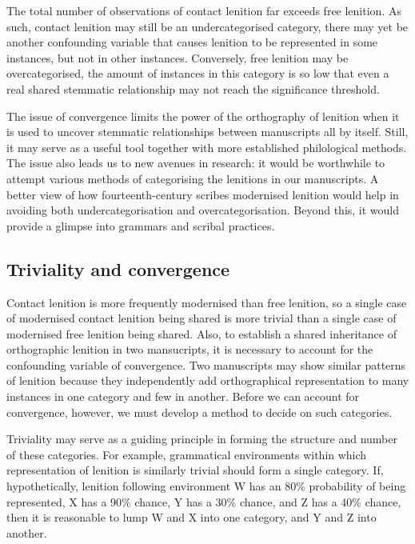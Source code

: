 The total number of observations of contact lenition far exceeds free lenition. As such, contact lenition may still be an undercategorised category, \ie there may yet be another confounding variable that causes lenition to be represented in some instances, but not in other instances. Conversely, free lenition may be overcategorised, \ie the amount of instances in this category is so low that even a real shared stemmatic relationship may not reach the significance threshold. 

The issue of convergence  limits the power of the orthography of lenition when it is used to uncover stemmatic relationships between manuscripts all by itself. Still, it may serve as a useful tool together with more established philological methods. The issue also leads us to new avenues in research: it would be worthwhile to attempt various methods of categorising the lenitions in our manuscripts. A better view of how fourteenth-century scribes modernised lenition would help in avoiding both undercategorisation and overcategorisation. Beyond this, it would provide a glimpse into  grammars and scribal practices.

\subsection{Triviality and convergence}
\label{sec:triv-conv}

Contact lenition is more frequently modernised than free lenition, so a single case of modernised contact lenition being shared is more trivial than a single case of modernised free lenition being shared. 
Also, to establish a shared inheritance of orthographic lenition in two mansucripts,  it is necessary to account for the confounding variable of convergence. Two manuscripts may show similar patterns of lenition because they independently add orthographical representation to many instances in one category and few in another. Before we can account for convergence, however, we must develop a method to decide on such categories.

Triviality may serve as a guiding principle in forming the structure and number of these categories. For example, grammatical environments within which representation of lenition is similarly trivial should form a single category. If, hypothetically, lenition following environment W has an 80\% probability of being represented, X has a 90\% chance, Y has a 30\% chance, and Z has a 40\% chance, then it is reasonable to lump W and X into one category, and Y and Z into another.

